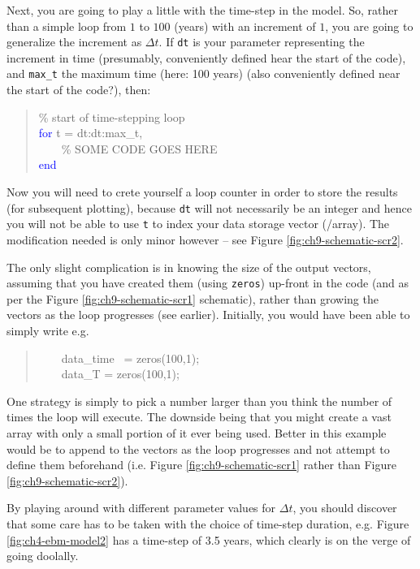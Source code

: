 \documentclass{tufte-book} %
\newenvironment{docspec}{\begin{quotation}\ttfamily\parskip0pt\parindent0pt\ignorespaces}{\end{quotation}}
\begin{document}
\noindent Next, you are going to play a little with the time-step in the model. So, rather than a simple loop from \(1\) to \(100\) (years) with an increment of \(1\), you are going to generalize  the increment as \(\Delta t\). If \texttt{dt} is your parameter representing the increment in time (presumably, conveniently defined hear the start of the code), and \texttt{max\_t} the maximum time (here: 100 years) (also conveniently defined near the start of the code?), then:
\begin{docspec}
\textcolor[rgb]{0,0.501961,0}{\% start of time-stepping loop}
\\\textcolor{blue}{for} t = dt:dt:max\_t,
\\ \ \ \ \ \textcolor[rgb]{0,0.501961,0}{\% SOME CODE GOES HERE}
\\\textcolor{blue}{end}
\end{docspec}
Now you will need to crete yourself a loop counter in order to store the results (for subsequent plotting),  because \texttt{dt} will not necessarily be an integer and hence you will not be able to use \texttt{t} to index your data storage vector (/array). The modification needed is only minor however -- see Figure \ref{fig:ch9-schematic-scr2}.

The only slight complication is in knowing the size of the output vectors, assuming that you have created them (using \texttt{zeros}) up-front in the code (and as per the Figure \ref{fig:ch9-schematic-scr1} schematic), rather than growing the vectors as the loop progresses (see earlier). Initially, you would have been able to simply write e.g.
\begin{docspec}
\ \ \ \ data\_time \ = zeros(100,1);
\\ \ \ \ \ data\_T = zeros(100,1);
\end{docspec}
 One strategy is simply to pick a  number larger than you think the number of times the loop will execute. The downside being that you might create a vast array with only a small portion of it ever being used. Better in this example would be to append to the vectors as the loop progresses and not attempt to define them beforehand (i.e. Figure \ref{fig:ch9-schematic-scr1} rather than Figure \ref{fig:ch9-schematic-scr2}).  

By playing around with different parameter values for \(\Delta t\), you should discover that some care has to be taken with the choice of time-step duration, e.g. Figure \ref{fig:ch4-ebm-model2} has a time-step of 3.5 years, which clearly is on the verge of going doolally. 
\end{document}
